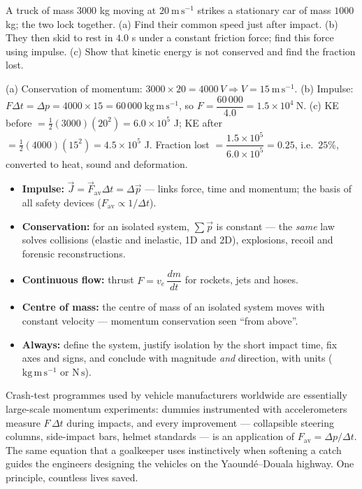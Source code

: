 \documentclass[11pt]{article}
\begin{document}
\begin{exercice}
A truck of mass $3000$ kg moving at $20\ \mathrm{m\,s^{-1}}$ strikes a stationary car of mass $1000$ kg; the two lock together. (a) Find their common speed just after impact. (b) They then skid to rest in $4.0$ s under a constant friction force; find this force using impulse. (c) Show that kinetic energy is not conserved and find the fraction lost.
\end{exercice}

\begin{corrige}[Exercise 1]
(a) Conservation of momentum: $3000\times 20 = 4000\,V \Rightarrow V = 15\ \mathrm{m\,s^{-1}}$.
(b) Impulse: $F\Delta t = \Delta p = 4000\times 15 = 60\,000\ \mathrm{kg\,m\,s^{-1}}$, so $F = \dfrac{60\,000}{4.0} = 1.5\times10^{4}\ \mathrm{N}$.
(c) KE before $=\tfrac12(3000)(20^2)=6.0\times10^{5}$ J; KE after $=\tfrac12(4000)(15^2)=4.5\times10^{5}$ J. Fraction lost $=\dfrac{1.5\times10^{5}}{6.0\times10^{5}}=0.25$, i.e.\ $25\%$, converted to heat, sound and deformation.
\end{corrige}

\begin{aretenir}
\begin{itemize}
\item \textbf{Impulse:} $\vec{J}=\vec{F}_{\text{av}}\Delta t=\Delta\vec{p}$ --- links force, time and momentum; the basis of all safety devices ($F_{\text{av}}\propto 1/\Delta t$).
\item \textbf{Conservation:} for an isolated system, $\sum\vec{p}$ is constant --- the \emph{same} law solves collisions (elastic and inelastic, 1D and 2D), explosions, recoil and forensic reconstructions.
\item \textbf{Continuous flow:} thrust $F=v_e\,\dfrac{dm}{dt}$ for rockets, jets and hoses.
\item \textbf{Centre of mass:} the centre of mass of an isolated system moves with constant velocity --- momentum conservation seen ``from above''.
\item \textbf{Always:} define the system, justify isolation by the short impact time, fix axes and signs, and conclude with magnitude \emph{and} direction, with units ($\mathrm{kg\,m\,s^{-1}}$ or $\mathrm{N\,s}$).
\end{itemize}
\end{aretenir}

\begin{savaistu}
Crash-test programmes used by vehicle manufacturers worldwide are essentially large-scale momentum experiments: dummies instrumented with accelerometers measure $F\,\Delta t$ during impacts, and every improvement --- collapsible steering columns, side-impact bars, helmet standards --- is an application of $F_{\text{av}}=\Delta p/\Delta t$. The same equation that a goalkeeper uses instinctively when softening a catch guides the engineers designing the vehicles on the Yaound\'e--Douala highway. One principle, countless lives saved.
\end{savaistu}
\end{document}
